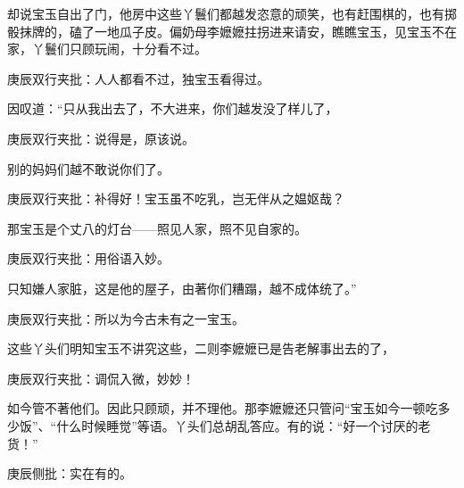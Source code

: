 \begin{parag}
    却说宝玉自出了门，他房中这些丫鬟们都越发恣意的顽笑，也有赶围棋的，也有掷骰抹牌的，磕了一地瓜子皮。偏奶母李嬷嬷拄拐进来请安，瞧瞧宝玉，见宝玉不在家，丫鬟们只顾玩闹，十分看不过。\begin{note}庚辰双行夹批：人人都看不过，独宝玉看得过。\end{note}因叹道：“只从我出去了，不大进来，你们越发没了样儿了，\begin{note}庚辰双行夹批：说得是，原该说。\end{note}别的妈妈们越不敢说你们了。\begin{note}庚辰双行夹批：补得好！宝玉虽不吃乳，岂无伴从之媪妪哉？\end{note}那宝玉是个丈八的灯台——照见人家，照不见自家的。\begin{note}庚辰双行夹批：用俗语入妙。\end{note}只知嫌人家脏，这是他的屋子，由著你们糟蹋，越不成体统了。”\begin{note}庚辰双行夹批：所以为今古未有之一宝玉。\end{note}这些丫头们明知宝玉不讲究这些，二则李嬷嬷已是告老解事出去的了，\begin{note}庚辰双行夹批：调侃入微，妙妙！\end{note}如今管不著他们。因此只顾顽，并不理他。那李嬷嬷还只管问“宝玉如今一顿吃多少饭”、“什么时候睡觉”等语。丫头们总胡乱答应。有的说：“好一个讨厌的老货！”\begin{note}庚辰侧批：实在有的。\end{note}
\end{parag}


